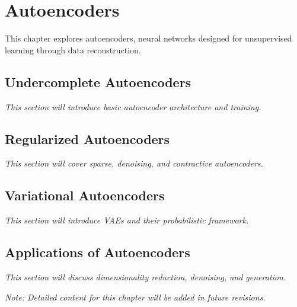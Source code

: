 
\chapter{Autoencoders}
\label{chap:autoencoders}

This chapter explores autoencoders, neural networks designed for unsupervised learning through data reconstruction.

\section{Undercomplete Autoencoders}

\textit{This section will introduce basic autoencoder architecture and training.}

\section{Regularized Autoencoders}

\textit{This section will cover sparse, denoising, and contractive autoencoders.}

\section{Variational Autoencoders}

\textit{This section will introduce VAEs and their probabilistic framework.}

\section{Applications of Autoencoders}

\textit{This section will discuss dimensionality reduction, denoising, and generation.}

\vspace{1em}
\noindent\textit{Note: Detailed content for this chapter will be added in future revisions.}
